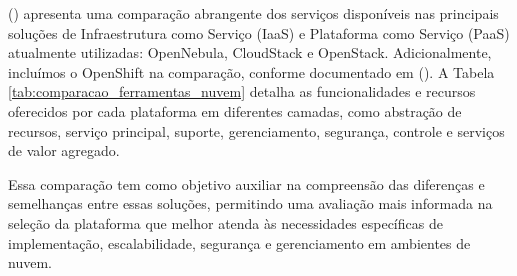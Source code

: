 (\cite{vogel2016private}) apresenta uma comparação abrangente dos serviços disponíveis nas principais soluções de Infraestrutura como Serviço (IaaS) e Plataforma como Serviço (PaaS) atualmente utilizadas: OpenNebula, CloudStack e OpenStack. Adicionalmente, incluímos o OpenShift na comparação, conforme documentado em (\cite{OpenShiftDocumentation}). A Tabela \ref{tab:comparacao_ferramentas_nuvem} detalha as funcionalidades e recursos oferecidos por cada plataforma em diferentes camadas, como abstração de recursos, serviço principal, suporte, gerenciamento, segurança, controle e serviços de valor agregado.

Essa comparação tem como objetivo auxiliar na compreensão das diferenças e semelhanças entre essas soluções, permitindo uma avaliação mais informada na seleção da plataforma que melhor atenda às necessidades específicas de implementação, escalabilidade, segurança e gerenciamento em ambientes de nuvem.

\small %

